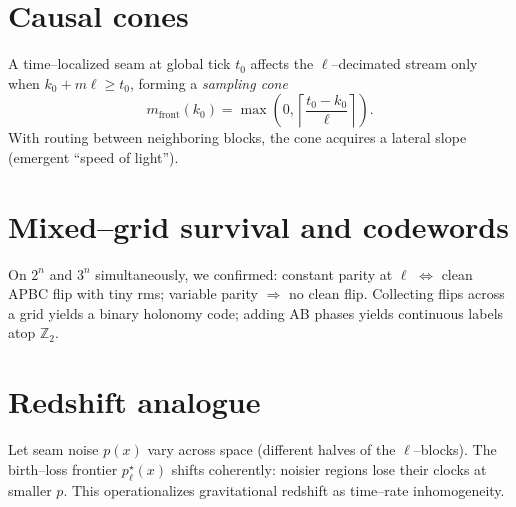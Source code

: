 \documentclass[11pt]{article}
\newcommand{\Z}{\mathbb{Z}}
\begin{document}
\section{Causal cones}
A time--localized seam at global tick $t_0$ affects the $\ell$--decimated stream only when $k_0+m\ell\ge t_0$, forming a \emph{sampling cone}
\begin{equation}
m_{\mathrm{front}}(k_0)=\max\!\left(0,\left\lceil\frac{t_0-k_0}{\ell}\right\rceil\right).
\end{equation}
With routing between neighboring blocks, the cone acquires a lateral slope (emergent ``speed of light'').

\section{Mixed--grid survival and codewords}
On $2^n$ and $3^n$ simultaneously, we confirmed: constant parity at $\ell$ $\Leftrightarrow$ clean APBC flip with tiny rms; variable parity $\Rightarrow$ no clean flip. Collecting flips across a grid yields a binary holonomy code; adding AB phases yields continuous labels atop $\Z_2$.

\section{Redshift analogue}
Let seam noise $p(x)$ vary across space (different halves of the $\ell$--blocks). The birth--loss frontier $p_\ell^\star(x)$ shifts coherently: noisier regions lose their clocks at smaller $p$. This operationalizes gravitational redshift as time--rate inhomogeneity.
\end{document}
